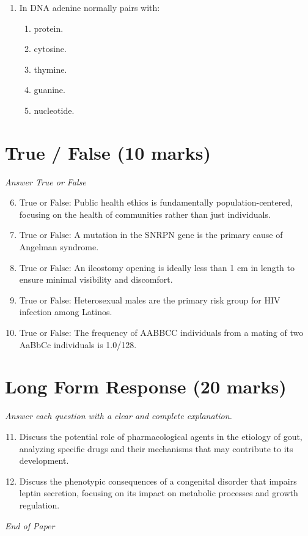 \documentclass[12pt]{article}
\begin{document}
\begin{enumerate}[label=\arabic*.]
\begin{enumerate}[label=(\alph*)]
    \item Nitrous Oxide
    \item Nitric Acid
    \item Nitrites
    \item Nitrogen
\end{enumerate}
\item In DNA adenine normally pairs with:
\begin{enumerate}[label=(\alph*)]
    \item protein.
    \item cytosine.
    \item thymine.
    \item guanine.
    \item nucleotide.
\end{enumerate}
\end{enumerate}

\section*{True / False (10 marks)}
\textit{Answer True or False}
\begin{enumerate}[label=\arabic*.]
\setcounter{enumi}{5}
\item True or False: Public health ethics is fundamentally population-centered, focusing on the health of communities rather than just individuals.
\item True or False: A mutation in the SNRPN gene is the primary cause of Angelman syndrome.
\item True or False: An ileostomy opening is ideally less than 1 cm in length to ensure minimal visibility and discomfort.
\item True or False: Heterosexual males are the primary risk group for HIV infection among Latinos.
\item True or False: The frequency of AABBCC individuals from a mating of two AaBbCc individuals is 1.0/128.
\end{enumerate}

\section*{Long Form Response (20 marks)}
\textit{Answer each question with a clear and complete explanation.}
\begin{enumerate}[label=\arabic*.]
\setcounter{enumi}{10}
\item Discuss the potential role of pharmacological agents in the etiology of gout, analyzing specific drugs and their mechanisms that may contribute to its development.
\item Discuss the phenotypic consequences of a congenital disorder that impairs leptin secretion, focusing on its impact on metabolic processes and growth regulation.
\end{enumerate}

\vfill
\noindent\textit{End of Paper}
\end{document}
